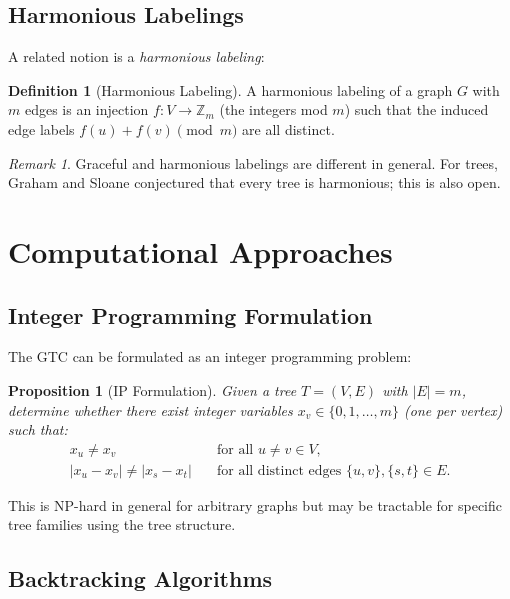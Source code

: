 \documentclass[12pt,a4paper]{amsart}
\newtheorem{proposition}[theorem]{Proposition}
\theoremstyle{definition}
\newtheorem{definition}[theorem]{Definition}
\theoremstyle{remark}
\newtheorem{remark}[theorem]{Remark}
\newcommand{\Z}{\mathbb{Z}}
\begin{document}
\subsection{Harmonious Labelings}

A related notion is a \emph{harmonious labeling}:

\begin{definition}[Harmonious Labeling]
A harmonious labeling of a graph $G$ with $m$ edges is an injection
$f: V \to \Z_m$ (the integers mod $m$) such that the induced edge labels
$f(u) + f(v) \pmod m$ are all distinct.
\end{definition}

\begin{remark}
Graceful and harmonious labelings are different in general. For trees, Graham and
Sloane \cite{GrahamSloane1980} conjectured that every tree is harmonious; this is
also open.
\end{remark}

\section{Computational Approaches}\label{sec:computational}

\subsection{Integer Programming Formulation}

The GTC can be formulated as an integer programming problem:

\begin{proposition}[IP Formulation]\label{prop:ip}
Given a tree $T = (V, E)$ with $|E| = m$, determine whether there exist
integer variables $x_v \in \{0, 1, \ldots, m\}$ (one per vertex) such that:
\begin{align*}
  x_u \neq x_v & \quad \text{for all } u \neq v \in V, \\
  |x_u - x_v| \neq |x_s - x_t| & \quad \text{for all distinct edges } \{u,v\}, \{s,t\} \in E.
\end{align*}
\end{proposition}

This is NP-hard in general for arbitrary graphs but may be tractable for specific
tree families using the tree structure.

\subsection{Backtracking Algorithms}
\end{document}
